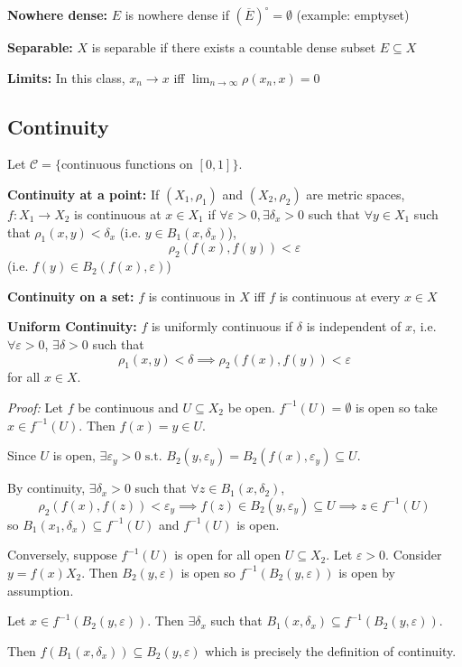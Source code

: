 \documentclass[12pt]{report}
\newcommand{\ep}{\varepsilon}
\newcommand{\sub}{\subseteq}
\newcommand{\st}{\text{ s.t. }}
\renewcommand{\bar}[1]{\overline{#1}}
\newenvironment*{tbox}[2][gray]{
    \begin{tcolorbox}[
        parbox=false,
        colback=#1!5!white,
        colframe=#1!75!black,
        breakable,
        title={#2}
    ]}
    {\end{tcolorbox}}
\begin{document}
    \textbf{Nowhere dense:} $E$ is nowhere dense if $(\bar E)^{\circ} = \emptyset$ (example: emptyset)

    \textbf{Separable:} $X$ is separable if there exists a countable dense subset $E \sub X$

    \textbf{Limits:} In this class, $x_n \to x$ iff $\lim_{n\to\infty} \rho(x_n, x) = 0$

\subsection*{Continuity} 
    Let $\mathcal C = \{\text{continuous functions on } [0,1]\}$.

    \textbf{Continuity at a point:} If $(X_1, \rho_1)$ and $(X_2, \rho_2)$ are metric spaces, $f: X_1 \to X_2$ is continuous at $x \in X_1$ if $\forall \ep > 0, \exists \delta_x > 0$ such that $\forall y \in X_1$ such that $\rho_1(x, y) < \delta_x$ (i.e. $y \in B_1(x, \delta_x)$),  
    \[\rho_2(f(x), f(y)) < \ep\]
    (i.e. $f(y) \in B_2(f(x), \ep)$)

    \textbf{Continuity on a set:} $f$ is continuous in $X$ iff $f$ is continuous at every $x \in X$

    \textbf{Uniform Continuity:} $f$ is uniformly continuous if $\delta$ is independent of $x$, i.e. $\forall \ep > 0$, $\exists \delta > 0$ such that 
    \[\rho_1(x, y) < \delta \implies \rho_2(f(x), f(y)) < \ep\]
    for all $x \in X$. 

    \begin{tbox}{\textbf{Proposition:} $f: X_1 \to X_2$ is continuous iff $f^{-1}(U) \sub X_1$ is open for all open $U \sub X_2$}
        \emph{Proof:} Let $f$ be continuous and $U \sub X_2$ be open. $f^{-1}(U) = \emptyset$ is open so take $x \in f^{-1}(U)$. Then $f(x) = y \in U$. 
        
        Since $U$ is open, $\exists \ep_y > 0 \st B_2(y, \ep_y) = B_2(f(x), \ep_y) \sub U$. 
        
        By continuity, $\exists \delta_x > 0$ such that $\forall z \in B_1(x, \delta_2)$, 
        \[\rho_2(f(x), f(z)) < \ep_y \implies f(z) \in B_2(y, \ep_y) \sub U \implies z \in f^{-1}(U)\]
        so $B_1(x_1, \delta_x) \sub f^{-1}(U)$ and $f^{-1}(U)$ is open.

        Conversely, suppose $f^{-1}(U)$ is open for all open $U \sub X_2$. Let $\ep > 0$. Consider $y = f(x) X_2$. Then $B_2(y, \ep)$ is open so $f^{-1}(B_2(y, \ep))$ is open by assumption. 
        
        Let $x \in f^{-1}(B_2(y, \ep))$. Then $\exists \delta_x$ such that $B_1(x, \delta_x) \sub f^{-1}(B_2(y, \ep))$. 

        Then $f(B_1(x, \delta_x)) \sub B_2(y, \ep)$ which is precisely the definition of continuity.
    \end{tbox}
\end{document}
